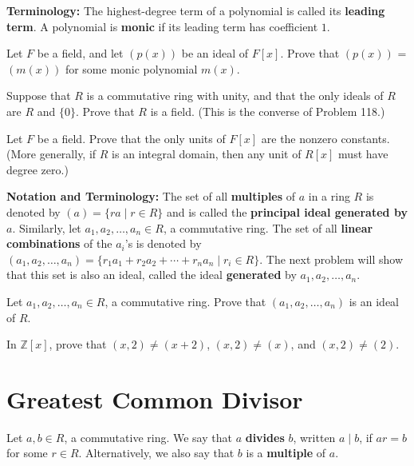 \textbf{Terminology:} The highest-degree term of a polynomial is called its \textbf{leading term}. A polynomial is \textbf{monic} if its leading term has coefficient \(1\).

\begin{problem}
Let \(F\) be a field, and let \((p(x))\) be an ideal of \(F[x]\). Prove that \((p(x))\) = \((m(x))\) for some monic polynomial \(m(x)\).
\end{problem}

\begin{problem}
Suppose that \(R\) is a commutative ring with unity, and that the only ideals of \(R\) are \(R\) and \(\{0\}\). Prove that \(R\) is a field. (This is the converse of Problem 118.)
\end{problem}

\begin{problem}
Let \(F\) be a field. Prove that the only units of \(F[x]\) are the nonzero constants. (More generally, if \(R\) is an integral domain, then any unit of \(R[x]\) must have degree zero.)
\end{problem}

\textbf{Notation and Terminology:} The set of all \textbf{multiples} of \(a\) in a ring \(R\) is denoted by \((a) = \{ra \mid r\in R\}\) and is called the \textbf{principal ideal generated by} \(a\). Similarly, let \(a_1, a_2, \ldots, a_n \in R\), a commutative ring. The set of all \textbf{linear combinations} of the \(a_i\)'s is denoted by \((a_1, a_2, \ldots, a_n) = \{r_1a_1 + r_2a_2 + \cdots + r_na_n \mid r_i \in R\} \). The next problem will show that this set is also an ideal, called the ideal \textbf{generated} by \(a_1, a_2, \ldots, a_n\).

\begin{problem}
Let \(a_1, a_2, \ldots, a_n \in R\), a commutative ring. Prove that \((a_1, a_2, \ldots, a_n)\) is an ideal of \(R\).
\end{problem}

\begin{problem}
In \(\mathbb{Z}[x]\), prove that \((x,2) \neq (x+2)\), \((x,2) \neq (x)\), and \((x,2) \neq (2)\).
\end{problem}

\section{Greatest Common Divisor}
\begin{definition}
Let \(a,b\in R\), a commutative ring. We say that \(a\) \textbf{divides} \(b\), written \(a\mid b\),  if \(ar = b\) for some \(r \in R\). Alternatively, we also say that \(b\) is a \textbf{multiple} of \(a\).
\end{definition}

